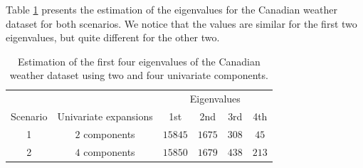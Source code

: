 Table \ref{tab:eigenvalues} presents the estimation of the eigenvalues for the Canadian weather dataset for both scenarios. We notice that the values are similar for the first two eigenvalues, but quite different for the other two. 
\begin{table}
\centering
\begin{tabular}{c c | c c c c}
 & & \multicolumn{4}{c}{Eigenvalues} \\
Scenario & Univariate expansions & 1st & 2nd & 3rd & 4th \\
\hline
1 & $2$ components & $15845$ & $1675$ & $308$ & $45$ \\
2 & $4$ components & $15850$ & $1679$ & $438$ & $213$ \\
\hline
\end{tabular}
\caption{Estimation of the first four eigenvalues of the Canadian weather dataset using two and four univariate components.}
\label{tab:eigenvalues}
\end{table}
